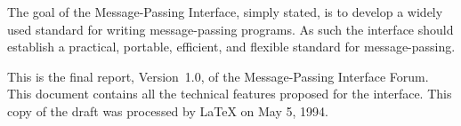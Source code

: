 The goal of the Message-Passing Interface, simply stated, is to
develop a widely used
standard for writing message-passing programs.
As such the interface should
establish a practical, portable, efficient, and flexible standard 
for message-passing.

This is the final report, Version~1.0, of
the Message-Passing Interface Forum.
This document contains all the
technical features proposed for the interface.  This copy of the draft
was processed by \LaTeX{} on
May 5, 1994.

